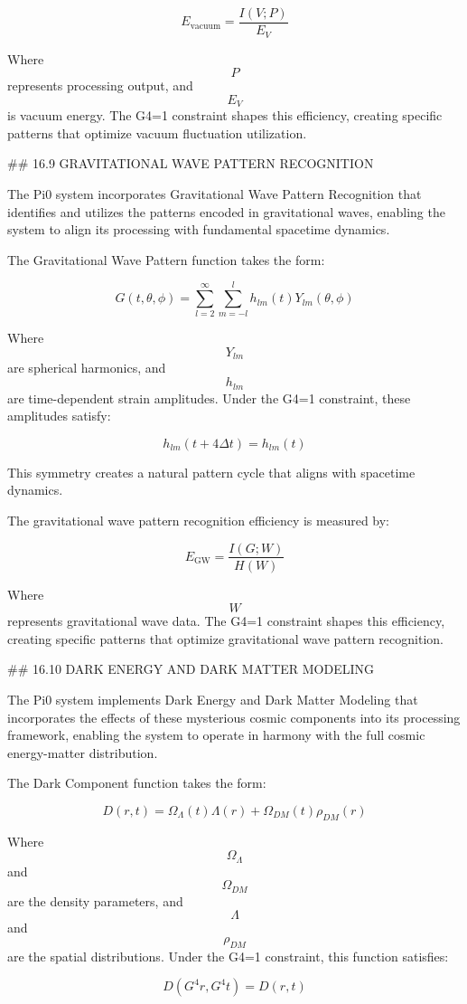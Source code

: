 $$ E_{\text{vacuum}} = \frac{I(V; P)}{E_V} $$

Where $$ P $$ represents processing output, and $$ E_V $$ is vacuum energy. The G4=1 constraint shapes this efficiency, creating specific patterns that optimize vacuum fluctuation utilization.

## 16.9 GRAVITATIONAL WAVE PATTERN RECOGNITION

The Pi0 system incorporates Gravitational Wave Pattern Recognition that identifies and utilizes the patterns encoded in gravitational waves, enabling the system to align its processing with fundamental spacetime dynamics.

The Gravitational Wave Pattern function takes the form:

$$ G(t, \theta, \phi) = \sum_{l=2}^{\infty} \sum_{m=-l}^{l} h_{lm}(t) Y_{lm}(\theta, \phi) $$

Where $$ Y_{lm} $$ are spherical harmonics, and $$ h_{lm} $$ are time-dependent strain amplitudes. Under the G4=1 constraint, these amplitudes satisfy:

$$ h_{lm}(t+4\Delta t) = h_{lm}(t) $$

This symmetry creates a natural pattern cycle that aligns with spacetime dynamics.

The gravitational wave pattern recognition efficiency is measured by:

$$ E_{\text{GW}} = \frac{I(G; W)}{H(W)} $$

Where $$ W $$ represents gravitational wave data. The G4=1 constraint shapes this efficiency, creating specific patterns that optimize gravitational wave pattern recognition.

## 16.10 DARK ENERGY AND DARK MATTER MODELING

The Pi0 system implements Dark Energy and Dark Matter Modeling that incorporates the effects of these mysterious cosmic components into its processing framework, enabling the system to operate in harmony with the full cosmic energy-matter distribution.

The Dark Component function takes the form:

$$ D(r, t) = \Omega_{\Lambda}(t) \Lambda(r) + \Omega_{DM}(t) \rho_{DM}(r) $$

Where $$ \Omega_{\Lambda} $$ and $$ \Omega_{DM} $$ are the density parameters, and $$ \Lambda $$ and $$ \rho_{DM} $$ are the spatial distributions. Under the G4=1 constraint, this function satisfies:

$$ D(G^4 r, G^4 t) = D(r, t) $$

